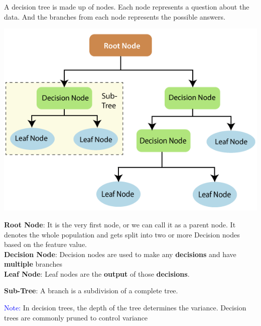 \documentclass[letterpaper, 10.5pt,landscape]{article}
\begin{document}
\begin{multicols*}{3}
\vspace{3pt}
A decision tree is made up of nodes. Each node represents a question about the data. And the branches from each node represents the possible answers.

\vspace{-5pt}
\begin{center}
    \begin{minipage}{0.75\linewidth}
    \includegraphics[width=\textwidth]{figures/decision_trees.PNG}
    \end{minipage}
\end{center}
\vspace{-5pt}

\textbf{Root Node}: It is the very first node, or we can call it as a parent node. It denotes the whole population and gets split into two or more Decision nodes based on the feature value. \\
\textbf{Decision Node}: Decision nodes are used to make any \textbf{decisions} and have \textbf{multiple} branches \\

\textbf{Leaf Node}: Leaf nodes are the \textbf{output} of those \textbf{decisions}.

\textbf{Sub-Tree}: A branch is a subdivision of a complete tree. 

\vspace{2pt}

\textcolor{blue}{Note:} In decision trees, the depth of the tree determines the variance. Decision trees are commonly pruned to control variance


\end{multicols*}
\end{document}
